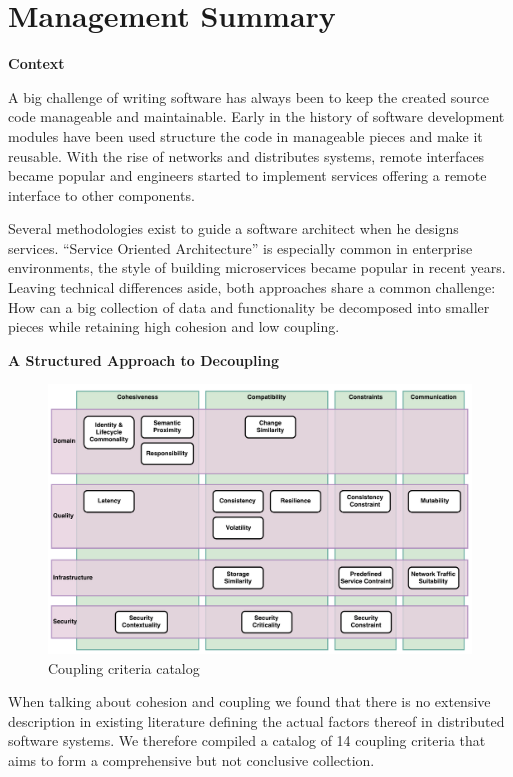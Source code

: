 \chapter{Management Summary}


\textbf{Context}

A big challenge of writing software has always been to keep the created source code manageable and maintainable. Early in the history of software development modules have been used structure the code in manageable pieces and make it reusable. With the rise of networks and distributes systems, remote interfaces became popular and engineers started to implement services offering a remote interface to other components.

Several methodologies exist to guide a software architect when he designs services. \enquote{Service Oriented Architecture} is especially common in enterprise environments, the style of building microservices became popular in recent years. Leaving technical differences aside, both approaches share a common challenge: How can a big collection of data and functionality be decomposed into smaller pieces while retaining high cohesion and low coupling.

\textbf{A Structured Approach to Decoupling}

\begin{figure}
	\includegraphics[scale=0.4]{diagrams/CouplingCatalog.pdf}
	\caption{Coupling criteria catalog}
	\label{fig:cc-catalog-mgmt-summary}
\end{figure}

When talking about cohesion and coupling we found that there is no extensive description in existing literature defining the actual factors thereof in distributed software systems. We therefore compiled a catalog of 14 coupling criteria that aims to form a comprehensive but not conclusive collection. 

